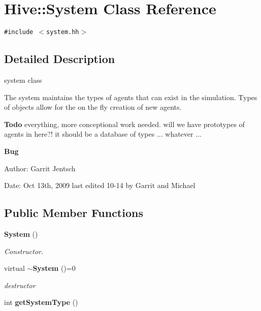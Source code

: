 \section{Hive::System Class Reference}
\label{classHive_1_1System}
{\tt \#include $<$system.hh$>$}



\subsection{Detailed Description}
system class 

The system maintains the types of agents that can exist in the simulation. Types of objects allow for the on the fly creation of new agents.

\begin{Desc}
\item[{\bf Todo}]everything, more conceptional work needed. will we have prototypes of agents in here?! it should be a database of types ... whatever ...\end{Desc}
\begin{Desc}
\item[{\bf Bug}]\end{Desc}
\begin{Desc}
\item[Author:]Garrit Jentsch\end{Desc}
\begin{Desc}
\item[Date:]Oct 13th, 2009 last edited 10-14 by Garrit and Michael \end{Desc}
\subsection*{Public Member Functions}
\begin{CompactItemize}
\item 
{\bf System} ()
\begin{CompactList}\small\item\em Constructor. \item\end{CompactList}\item 
virtual {\bf $\sim$System} ()=0
\begin{CompactList}\small\item\em destructor \item\end{CompactList}\item 
int {\bf getSystemType} ()
\end{CompactItemize}
